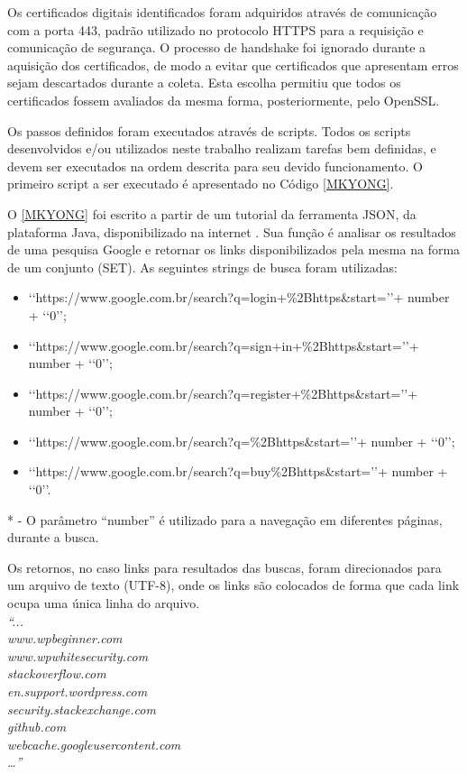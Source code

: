 		Os certificados digitais  identificados foram adquiridos através de comunicação com a porta 443, padrão utilizado no protocolo HTTPS para a requisição e comunicação de segurança. O processo de handshake foi ignorado durante a aquisição dos certificados, de modo a evitar que certificados que apresentam erros sejam descartados durante a coleta. Esta escolha permitiu que todos os certificados fossem avaliados da mesma forma, posteriormente, pelo OpenSSL.
		
		Os passos definidos foram executados através de scripts. Todos os scripts desenvolvidos e/ou utilizados neste trabalho realizam tarefas bem definidas, e devem ser  executados na ordem descrita para seu devido funcionamento. O primeiro script a ser executado é apresentado no Código \ref{MKYONG}.
		
		
		O \ref{MKYONG} foi escrito a partir de um tutorial da ferramenta JSON, da plataforma Java, disponibilizado na internet \cite{mkyong_url}. Sua função é analisar os resultados de uma pesquisa Google e retornar os links disponibilizados pela mesma na forma de um conjunto (SET). As seguintes strings de busca foram utilizadas:
		
		\begin{itemize}
			\item \lq\lq https://www.google.com.br/search?q=login+\%2Bhttps\&start=\rq\rq + number + \lq\lq0\rq\rq;
			\item \lq\lq https://www.google.com.br/search?q=sign+in+\%2Bhttps\&start=\rq\rq + number + \lq\lq0\rq\rq;
			\item \lq\lq https://www.google.com.br/search?q=register+\%2Bhttps\&start=\rq\rq + number + \lq\lq0\rq\rq;
			\item \lq\lq https://www.google.com.br/search?q=\%2Bhttps\&start=\rq\rq + number + \lq\lq0\rq\rq;
			\item \lq\lq https://www.google.com.br/search?q=buy\%2Bhttps\&start=\rq\rq + number + \lq\lq0\rq\rq.
		\end{itemize}
		* - O parâmetro “number” é utilizado para a navegação em diferentes páginas, durante a busca.
		
		Os retornos, no caso links para resultados das buscas, foram direcionados para um arquivo de texto (UTF-8), onde os links são colocados de forma que cada link ocupa uma única linha do arquivo.\\
		\textit{“...\\
		www.wpbeginner.com\\
		www.wpwhitesecurity.com\\
		stackoverflow.com\\
		en.support.wordpress.com\\
		security.stackexchange.com\\
		github.com\\
		webcache.googleusercontent.com\\
		…”}
	
